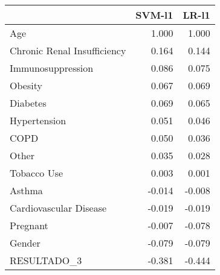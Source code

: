\begin{tabular}{lrr}
\toprule
{} &  SVM-l1 &  LR-l1 \\
\midrule
Age                         &   1.000 &  1.000 \\
Chronic Renal Insufficiency &   0.164 &  0.144 \\
Immunosuppression           &   0.086 &  0.075 \\
Obesity                     &   0.067 &  0.069 \\
Diabetes                    &   0.069 &  0.065 \\
Hypertension                &   0.051 &  0.046 \\
COPD                        &   0.050 &  0.036 \\
Other                       &   0.035 &  0.028 \\
Tobacco Use                 &   0.003 &  0.001 \\
Asthma                      &  -0.014 & -0.008 \\
Cardiovascular Disease      &  -0.019 & -0.019 \\
Pregnant                    &  -0.007 & -0.078 \\
Gender                      &  -0.079 & -0.079 \\
RESULTADO\_3                 &  -0.381 & -0.444 \\
\bottomrule
\end{tabular}
